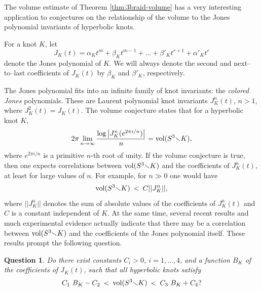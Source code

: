 \documentclass[11pt]{amsart}
\renewcommand{\setminus}{{\smallsetminus}}
\newcommand{\vol}{{\rm vol}}
\newcommand{\abs}[1]{{\left\vert #1 \right\vert}}
\theoremstyle{plain}
\newtheorem{question}[theorem]{Question}
\theoremstyle{definition}
\begin{document}
The volume estimate of Theorem \ref{thm:3braid-volume} has a very
interesting application to conjectures on the relationship of the
volume to the Jones polynomial invariants of hyperbolic knots.

For a knot $K$, let
$$J_K(t)= \alpha_K t^m+ \beta_K t^{m-1}+ \ldots + \beta'_K t^{r+1}+
\alpha'_K t^r$$
%
denote the Jones polynomial of $K$.  We will always denote the second
and next--to--last coefficients of $J_K(t)$ by $\beta_K$ and
$\beta'_K$, respectively.

The Jones polynomial fits into an infinite family of knot invariants:
the \emph{colored Jones} polynomials.  These are Laurent polynomial
knot invariants $J^n_K(t)$, $n>1$, where $J^2_K(t)=J_K(t)$.  The
volume conjecture \cite{kashaev:volume-conj, murakami-squared} states
that for a hyperbolic knot $K$,
$$2\pi \lim_{n\to \infty} { \frac{\log \abs {J^n_K(e^{2\pi i / n} )
}} {n}}= \vol(S^3 \setminus K),$$
%
where $e^{2\pi i /n}$ is a primitive $n$-th root of unity.  If the
volume conjecture is true, then one expects correlations between
$\vol(S^3 \setminus K)$ and the coefficients of $J_K^n(t)$, at least
for large values of $n$.  For example, for $n\gg 0$ one would have
$$\vol(S^3 \setminus K)\: < \: C || J_K^n ||,$$
%
where $|| J_K^n ||$ denotes the sum of absolute values of the
coefficients of $J_K^n(t)$ and $C$ is a constant independent of $K$.
At the same time, several recent results and much experimental
evidence \cite{ckp:simplest-knots, dasbach-lin:volumeish, fkp-07,
fkp:conway} actually indicate that there may be a correlation between
$\vol(S^3\setminus K)$ and the coefficients of the Jones polynomial
itself.  These results prompt the following question.

\begin{question}\label{question}
Do there exist constants $C_i>0$, $i=1, \ldots, 4$, and a function
$B_K$ of the coefficients of $J_K(t)$, such that all hyperbolic knots
satisfy
\begin{equation}
	C_1\ B_K-C_2 \: < \: \vol(S^3 \setminus K) \: < \: C_3\ B_K+C_4?
\label{eqn:question}
\end{equation}
\end{question}
\end{document}
